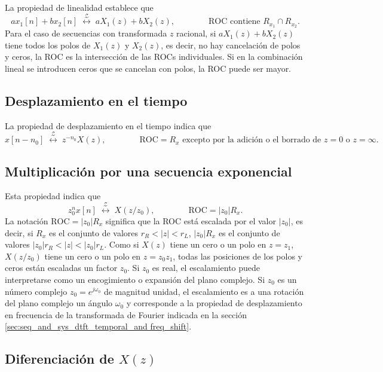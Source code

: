 \documentclass[a4paper]{report}
\begin{document}
La propiedad de linealidad establece que 
\[
 ax_1[n]+bx_2[n]\;\overset{\mathcal{Z}}{\longleftrightarrow}\;aX_1(z)+bX_2(z),
 \qquad\qquad\textrm{ROC contiene }R_{x_1}\cap R_{x_2}.
\]
Para el caso de secuencias con transformada \(z\) racional, si \(aX_1(z)+bX_2(z)\) tiene todos los polos de \(X_1(z)\) y \(X_2(z)\), es decir, no hay cancelación de polos y ceros, la ROC es la intersección de las ROCs individuales. Si en la combinación lineal se introducen ceros que se cancelan con polos, la ROC puede ser mayor.
 
\subsection{Desplazamiento en el tiempo} 
 
La propiedad de desplazamiento en el tiempo indica que 
\[
 x[n-n_0]\;\overset{\mathcal{Z}}{\longleftrightarrow}\;z^{-n_0}X(z),
 \qquad\qquad\textrm{ROC}=R_x
  \textrm{ excepto por la adición o el borrado de }z=0\textrm{ o }z=\infty. 
\]
 
\subsection{Multiplicación por una secuencia exponencial}  

Esta propiedad indica que 
\[
 z_0^nx[n]\;\overset{\mathcal{Z}}{\longleftrightarrow}\;X(z/z_0),
 \qquad\qquad\textrm{ROC}=|z_0|R_x.
\]
La notación \(\textrm{ROC}=|z_0|R_x\) significa que la ROC está escalada por el valor \(|z_0|\), es decir, si \(R_x\) es el conjunto de valores \(r_R<|z|<r_L\), \(|z_0|R_x\) es el conjunto de valores \(|z_0|r_R<|z|<|z_0|r_L\). Como si \(X(z)\) tiene un cero o un polo en \(z=z_1\), \(X(z/z_0)\) tiene un cero o un polo en \(z=z_0z_1\), todas las posiciones de los polos y ceros están escaladas un factor \(z_0\). Si \(z_0\) es real, el escalamiento puede interpretarse como un encogimiento o expansión del plano complejo. Si \(z_0\) es un número complejo \(z_0=e^{j\omega_0}\) de magnitud unidad, el escalamiento es a una rotación del plano complejo un ángulo \(\omega_0\) y corresponde a la propiedad de desplazamiento en frecuencia de la transformada de Fourier indicada en la sección \ref{sec:seq_and_sys_dtft_temporal_and freq_shift}.

\subsection{Diferenciación de \texorpdfstring{\(X(z)\)}{X(z)}}
\end{document}
